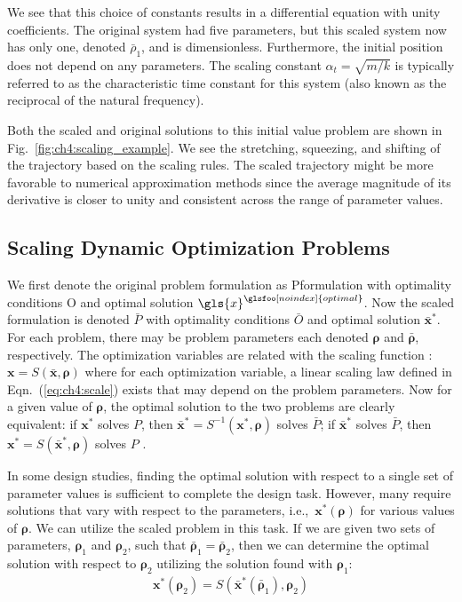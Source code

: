 \noindent We see that this choice of constants results in a differential equation with unity coefficients.
The original system had five parameters, but this scaled system now has only one, denoted $\bar{\rho}_1$, and is dimensionless.
Furthermore, the initial position does not depend on any parameters. The scaling constant $\alpha_t= \sqrt{m/k}$ is typically referred to as the characteristic time constant for this system (also known as the reciprocal of the natural frequency).



Both the scaled and original solutions to this initial value problem are shown in Fig.~\ref{fig:ch4:scaling_example}.
We see the stretching, squeezing, and shifting of the trajectory based on the scaling rules.
The scaled trajectory might be more favorable to numerical approximation methods since the average magnitude of its derivative is closer to unity and consistent across the range of parameter values.

\subsection{Scaling Dynamic Optimization Problems \label{sec:ch4:scaled_opt}}

We first denote the original problem formulation as \gls{Pformulation} with optimality conditions \gls{O} and optimal solution $\gls{x}^{\glsfoo[noindex]{optimal}}$.
Now the scaled formulation is denoted $\bar{P}$ with optimality conditions $\bar{O}$ and optimal solution $\bar{\bm{x}}^*$.
For each problem, there may be problem parameters each denoted $\bm{\rho}$ and $\bar{\bm{\rho}}$, respectively.
The optimization variables are related with the scaling function : $\bm{x} = S(\bar{\bm{x}}, \bm{\rho})$ where for each optimization variable, a linear scaling law defined in Eqn.~(\ref{eq:ch4:scale}) exists that may depend on the problem parameters.
Now for a given value of $\bm{\rho}$, the optimal solution to the two problems are clearly equivalent: if $\bm{x}^*$ solves $P$, then $\bar{\bm{x}}^* = S^{-1}(\bm{x}^*, \bm{\rho})$ solves $\bar{P}$; if $\bar{\bm{x}}^*$ solves $\bar{P}$, then $\bm{x}^* = S(\bar{\bm{x}}^*, \bm{\rho})$ solves $P$ \cite{Boyd2009a}.

In some design studies, finding the optimal solution with respect to a single set of parameter values is sufficient to complete the design task.
However, many require solutions that vary with respect to the parameters, i.e.,~$\bm{x}^*(\bm{\rho})$ for various values of $\bm{\rho}$.
We can utilize the scaled problem in this task.
If we are given two sets of parameters, $\bm{\rho}_1$ and $\bm{\rho}_2$, such that $\bar{\bm{\rho}}_1 = \bar{\bm{\rho}}_2$, then we can determine the optimal solution with respect to $\bm{\rho}_2$ utilizing the solution found with $\bm{\rho}_1$:
\begin{align}
\label{eq:ch4:opt_scale}
\bm{x}^*(\bm{\rho}_2) = S ( \bar{\bm{x}}^*( \bar{\bm{\rho}}_1 ), \bm{\rho}_2 )
\end{align}

